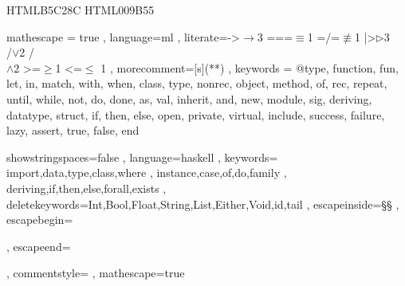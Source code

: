 \usepackage{xcolor}
\definecolor{YellowGreen} {HTML}{B5C28C}
\definecolor{ForestGreen} {HTML}{009B55}

\usepackage{xltxtra} %
\usepackage{polyglossia}
\setmainlanguage{russian}


\let\cyrillicfonttt\monofamily
\usepackage{listings}

  { mathescape = true
  , language=ml 
  , literate={->}{{$\to$}}3 {===}{{$\equiv$}}1 {=/=}{{$\not\equiv$}}1 {|>}{{$\triangleright$}}3 {\\/}{{$\vee$}}2 {/\\}{{$\wedge$}}2 {>=}{{$\ge$}}1 {<=}{{$\le$}} 1
  , morecomment=[s]{(*}{*)}
  , keywords = {@type, function, fun, let, in, match, with, when, class, type,
        nonrec, object, method, of, rec, repeat, until, while, not, do, done, 
        as, val, inherit, and,
        new, module, sig, deriving, datatype, struct, if, then, else, 
        open, private, virtual, include, success, failure,
        lazy, assert, true, false, end   }
  }
         { showstringspaces=false
         , language=haskell
         , keywords={ import,data,type,class,where
                    , instance,case,of,do,family
                    , deriving,if,then,else,forall,exists
                    }
         , deletekeywords={Int,Bool,Float,String,List,Either,Void,id,tail}
          , escapeinside=§§
          , escapebegin=\begin{russian}\color{red}
          , escapeend=\end{russian}
          , commentstyle=\color{DarkGreen}
         , mathescape=true
}

